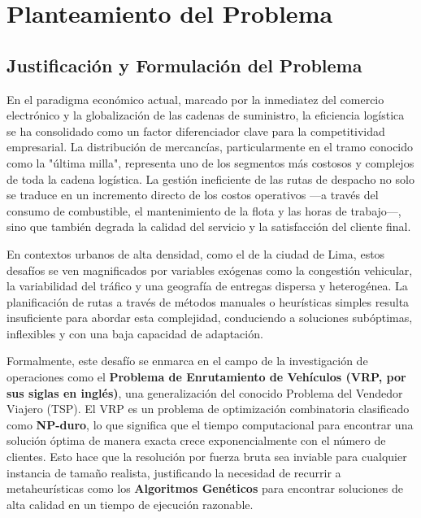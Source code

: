 \chapter{Planteamiento del Problema}
\label{chap:problema}

\section{Justificación y Formulación del Problema}
En el paradigma económico actual, marcado por la inmediatez del comercio electrónico y la globalización de las cadenas de suministro, la eficiencia logística se ha consolidado como un factor diferenciador clave para la competitividad empresarial. La distribución de mercancías, particularmente en el tramo conocido como la "última milla", representa uno de los segmentos más costosos y complejos de toda la cadena logística. La gestión ineficiente de las rutas de despacho no solo se traduce en un incremento directo de los costos operativos —a través del consumo de combustible, el mantenimiento de la flota y las horas de trabajo—, sino que también degrada la calidad del servicio y la satisfacción del cliente final.

En contextos urbanos de alta densidad, como el de la ciudad de Lima, estos desafíos se ven magnificados por variables exógenas como la congestión vehicular, la variabilidad del tráfico y una geografía de entregas dispersa y heterogénea. La planificación de rutas a través de métodos manuales o heurísticas simples resulta insuficiente para abordar esta complejidad, conduciendo a soluciones subóptimas, inflexibles y con una baja capacidad de adaptación.

Formalmente, este desafío se enmarca en el campo de la investigación de operaciones como el \textbf{Problema de Enrutamiento de Vehículos (VRP, por sus siglas en inglés)}, una generalización del conocido Problema del Vendedor Viajero (TSP). El VRP es un problema de optimización combinatoria clasificado como \textbf{NP-duro}, lo que significa que el tiempo computacional para encontrar una solución óptima de manera exacta crece exponencialmente con el número de clientes. Esto hace que la resolución por fuerza bruta sea inviable para cualquier instancia de tamaño realista, justificando la necesidad de recurrir a metaheurísticas como los \textbf{Algoritmos Genéticos} para encontrar soluciones de alta calidad en un tiempo de ejecución razonable.

